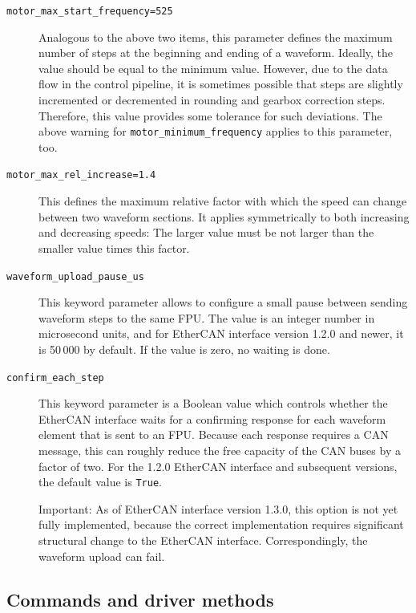 \documentclass[11pt,a4paper]{report}
\begin{document}
\begin{description}
\item[\texttt{motor\_max\_start\_frequency=525}] Analogous to the
  above two items, this parameter defines the maximum number of steps
  at the beginning and ending of a waveform.  Ideally, the value
  should be equal to the minimum value. However, due to the data flow
  in the control pipeline, it is sometimes possible that steps are
  slightly incremented or decremented in rounding and gearbox
  correction steps. Therefore, this value provides some tolerance for
  such deviations. The above warning for
  \texttt{motor\_minimum\_frequency} applies to this parameter, too.
  
\item[\texttt{motor\_max\_rel\_increase=1.4}] This defines the maximum
  relative factor with which the speed can change between two waveform
  sections. It applies symmetrically to both increasing and decreasing
  speeds: The larger value must be not larger than the smaller value
  times this factor.
  
\label{it:waveform_upload_pause_ms}
\item[\texttt{waveform\_upload\_pause\_us}] This keyword parameter
  allows to configure a small pause between sending waveform steps to
  the same FPU. The value is an integer number in microsecond units,
  and for EtherCAN interface version 1.2.0 and newer, it is 50\,000 by default. If
  the value is zero, no waiting is done.

\label{it:confirm_each_step}  
\item[\texttt{confirm\_each\_step}] This keyword parameter is a
  Boolean value which controls whether the EtherCAN interface waits for a
  confirming response for each waveform element that is sent to an
  FPU. Because each response requires a CAN message, this can roughly
  reduce the free capacity of the CAN buses by a factor of two. For the
  1.2.0 EtherCAN interface and subsequent versions, the default value is \texttt{True}.

  Important: As of EtherCAN interface version 1.3.0, this option is not yet fully
  implemented, because the correct implementation requires significant
  structural change to the EtherCAN interface. Correspondingly, the waveform
  upload can fail.
  
\end{description}


\subsection{Commands and driver methods}
\label{sec:commands}
\end{document}
